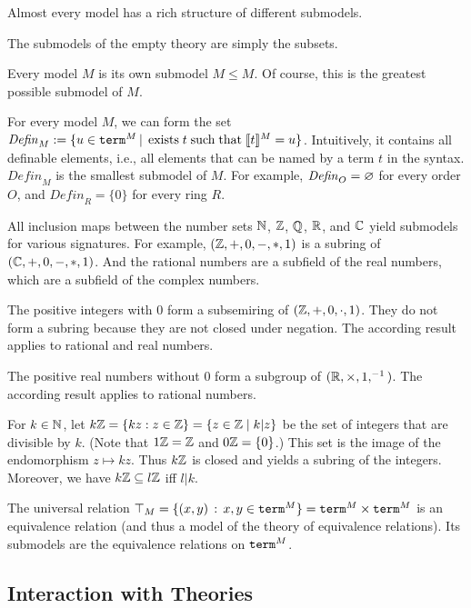 \begin{example}[Submodels]
Almost every model has a rich structure of different submodels.
\begin{compactitem}
\item The submodels of the empty theory are simply the subsets.
\item Every model $M$ is its own submodel $M\leq M$.
Of course, this is the greatest possible submodel of $M$.
\item For every model $M$, we can form the set $\mathit{Defin}_M := \{u\in \mathtt{term}^M\,|\,\;\mathrm{exists}\; t \;\mathrm{such}\;\mathrm{that}\; \llbracket t\rrbracket^{M}=u\}$.
Intuitively, it contains all definable elements, i.e., all elements that can be named by a term $t$ in the syntax.
$\mathit{Defin}_M$ is the smallest submodel of $M$.
For example, $\mathit{Defin}_O=\varnothing$ for every order $O$, and $\mathit{Defin}_R=\{0\}$ for every ring $R$.
\item All inclusion maps between the number sets $\mathbb{N}$, $\mathbb{Z}$, $\mathbb{Q}$, $\mathbb{R}$, and $\mathbb{C}$ yield submodels for various signatures.
For example, $(\mathbb{Z},+,0,-,*,1)$ is a subring of $(\mathbb{C},+,0,-,*,1)$.
And the rational numbers are a subfield of the real numbers, which are a subfield of the complex numbers.
\item The positive integers with $0$ form a subsemiring of $(\mathbb{Z},+,0,\cdot,1)$.
They do not form a subring because they are not closed under negation.
The according result applies to rational and real numbers.
\item The positive real numbers without $0$ form a subgroup of $(\mathbb{R},\times,1,^{-1})$.
The according result applies to rational numbers.
\item For $k\in\mathbb{N}$, let $k\mathbb{Z}=\{kz : z\in\mathbb{Z}\} = \{z\in\mathbb{Z}\;|\;k|z\}$ be the set of integers that are divisible by $k$.
(Note that $1\mathbb{Z}=\mathbb{Z}$ and $0\mathbb{Z}=\{0\}$.)
This set is the image of the endomorphism $z\mapsto kz$.
Thus $k\mathbb{Z}$ is closed and yields a subring of the integers.
Moreover, we have $k\mathbb{Z}\subseteq l\mathbb{Z}$ iff $l|k$.
\item The universal relation $\top_M=\{(x,y)\,:\,x,y\in\mathtt{term}^M\}=\mathtt{term}^M\times\mathtt{term}^M$ is an equivalence relation (and thus a model of the theory of equivalence relations).
Its submodels are the equivalence relations on $\mathtt{term}^M$.
\end{compactitem}
\end{example}

\subsection{Interaction with Theories}

